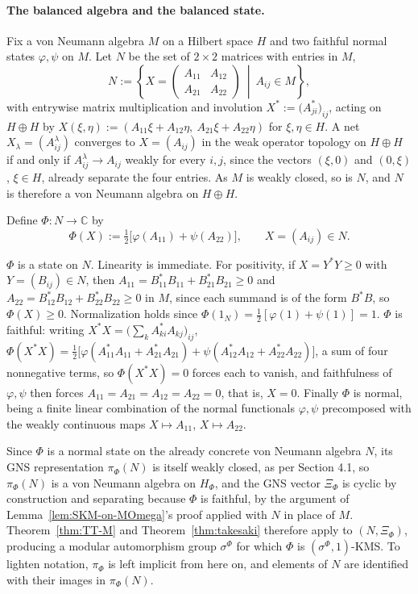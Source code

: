 \paragraph{The balanced algebra and the balanced state.}
Fix a von Neumann algebra $M$ on a Hilbert space $H$ and two faithful normal states $\varphi,\psi$ on $M$. Let $N$ be the set of $2\times2$ matrices with entries in $M$,
\[
N := \left\{ X = \begin{pmatrix} A_{11} & A_{12} \\ A_{21} & A_{22} \end{pmatrix} \ \middle|\ A_{ij} \in M \right\},
\]
with entrywise matrix multiplication and involution $X^* := \big(A_{ji}^*\big)_{ij}$, acting on $H \oplus H$ by $X(\xi,\eta) := (A_{11}\xi+A_{12}\eta,\ A_{21}\xi+A_{22}\eta)$ for $\xi,\eta \in H$. A net $X_\lambda = (A_{ij}^\lambda)$ converges to $X=(A_{ij})$ in the weak operator topology on $H \oplus H$ if and only if $A_{ij}^\lambda \to A_{ij}$ weakly for every $i,j$, since the vectors $(\xi,0)$ and $(0,\xi)$, $\xi \in H$, already separate the four entries. As $M$ is weakly closed, so is $N$, and $N$ is therefore a von Neumann algebra on $H \oplus H$.

\begin{definition}\label{def:balanced-state}
	Define $\Phi : N \to \mathbb{C}$ by
	\[
	\Phi(X) := \tfrac{1}{2}\big[\varphi(A_{11}) + \psi(A_{22})\big], \qquad X = (A_{ij}) \in N.
	\]
\end{definition}

$\Phi$ is a state on $N$. Linearity is immediate. For positivity, if $X = Y^*Y \geq 0$ with $Y=(B_{ij}) \in N$, then $A_{11} = B_{11}^*B_{11}+B_{21}^*B_{21} \geq 0$ and $A_{22}=B_{12}^*B_{12}+B_{22}^*B_{22}\geq 0$ in $M$, since each summand is of the form $B^*B$, so $\Phi(X) \geq 0$. Normalization holds since $\Phi(1_N) = \tfrac12[\varphi(1)+\psi(1)]=1$. $\Phi$ is faithful: writing $X^*X = \big(\sum_k A_{ki}^*A_{kj}\big)_{ij}$, $\Phi(X^*X) = \tfrac12\big[\varphi(A_{11}^*A_{11}+A_{21}^*A_{21}) + \psi(A_{12}^*A_{12}+A_{22}^*A_{22})\big]$, a sum of four nonnegative terms, so $\Phi(X^*X)=0$ forces each to vanish, and faithfulness of $\varphi,\psi$ then forces $A_{11}=A_{21}=A_{12}=A_{22}=0$, that is, $X=0$. Finally $\Phi$ is normal, being a finite linear combination of the normal functionals $\varphi,\psi$ precomposed with the weakly continuous maps $X \mapsto A_{11}$, $X \mapsto A_{22}$.

Since $\Phi$ is a normal state on the already concrete von Neumann algebra $N$, its GNS representation $\pi_\Phi(N)$ is itself weakly closed, as per Section 4.1, so $\pi_\Phi(N)$ is a von Neumann algebra on $H_\Phi$, and the GNS vector $\Xi_\Phi$ is cyclic by construction and separating because $\Phi$ is faithful, by the argument of Lemma~\ref{lem:SKM-on-MOmega}'s proof applied with $N$ in place of $M$. Theorem~\ref{thm:TT-M} and Theorem~\ref{thm:takesaki} therefore apply to $(N,\Xi_\Phi)$, producing a modular automorphism group $\sigma^\Phi$ for which $\Phi$ is $(\sigma^\Phi,1)$-KMS. To lighten notation, $\pi_\Phi$ is left implicit from here on, and elements of $N$ are identified with their images in $\pi_\Phi(N)$.

